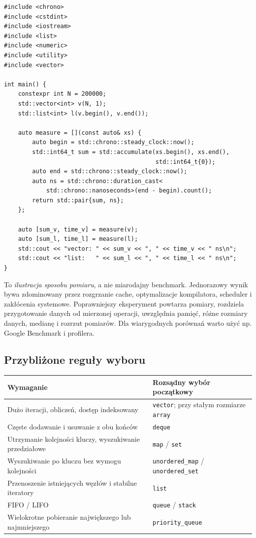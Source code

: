 \begin{lstlisting}[caption={Prosty szkielet pomiaru vector i list (C++20); kompletny program.}]
#include <chrono>
#include <cstdint>
#include <iostream>
#include <list>
#include <numeric>
#include <utility>
#include <vector>

int main() {
    constexpr int N = 200000;
    std::vector<int> v(N, 1);
    std::list<int> l(v.begin(), v.end());

    auto measure = [](const auto& xs) {
        auto begin = std::chrono::steady_clock::now();
        std::int64_t sum = std::accumulate(xs.begin(), xs.end(),
                                           std::int64_t{0});
        auto end = std::chrono::steady_clock::now();
        auto ns = std::chrono::duration_cast<
            std::chrono::nanoseconds>(end - begin).count();
        return std::pair{sum, ns};
    };

    auto [sum_v, time_v] = measure(v);
    auto [sum_l, time_l] = measure(l);
    std::cout << "vector: " << sum_v << ", " << time_v << " ns\n";
    std::cout << "list:   " << sum_l << ", " << time_l << " ns\n";
}
\end{lstlisting}

To \emph{ilustracja sposobu pomiaru}, a nie miarodajny benchmark.
Jednorazowy wynik bywa zdominowany przez rozgrzanie cache, optymalizacje
kompilatora, scheduler i zakłócenia systemowe. Poprawniejszy eksperyment
powtarza pomiary, rozdziela przygotowanie danych od mierzonej operacji,
uwzględnia pamięć, różne rozmiary danych, medianę i rozrzut pomiarów.
Dla wiarygodnych porównań warto użyć np. Google Benchmark i profilera.

\subsection{Przybliżone reguły wyboru}

\begin{center}
\small
\begin{tabularx}{\textwidth}{@{}lX@{}}
\toprule
\textbf{Wymaganie} & \textbf{Rozsądny wybór początkowy} \\
\midrule
Dużo iteracji, obliczeń, dostęp indeksowany & \texttt{vector}; przy stałym rozmiarze \texttt{array} \\
Częste dodawanie i usuwanie z obu końców & \texttt{deque} \\
Utrzymanie kolejności kluczy, wyszukiwanie przedziałowe & \texttt{map} / \texttt{set} \\
Wyszukiwanie po kluczu bez wymogu kolejności & \texttt{unordered\_map} / \texttt{unordered\_set} \\
Przenoszenie istniejących węzłów i stabilne iteratory & \texttt{list} \\
FIFO / LIFO & \texttt{queue} / \texttt{stack} \\
Wielokrotne pobieranie największego lub najmniejszego & \texttt{priority\_queue} \\
\bottomrule
\end{tabularx}
\end{center}

